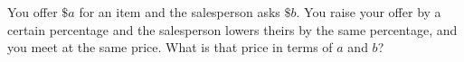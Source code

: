 You offer $\$a$ for an item and the salesperson asks $\$b$. You raise your offer by a certain percentage and the salesperson lowers theirs by the same percentage, and you meet at the same price. What is that price in terms of $a$ and $b$?
